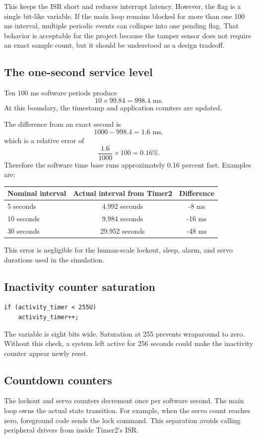\documentclass[11pt,a4paper]{article}
\begin{document}
This keeps the ISR short and reduces interrupt latency. However, the flag is a single bit-like variable. If the main loop remains blocked for more than one 100 ms interval, multiple periodic events can collapse into one pending flag. That behavior is acceptable for the project because the tamper sensor does not require an exact sample count, but it should be understood as a design tradeoff.

\subsection{The one-second service level}
Ten 100 ms software periods produce
\[
10\times99.84=998.4\text{ ms}.
\]
At this boundary, the timestamp and application counters are updated.

The difference from an exact second is
\[
1000-998.4=1.6\text{ ms},
\]
which is a relative error of
\[
\frac{1.6}{1000}\times100=0.16\%.
\]
Therefore the software time base runs approximately 0.16 percent fast. Examples are:
\begin{center}
\begin{tabular}{lcc}
\toprule
Nominal interval & Actual interval from Timer2 & Difference \\
\midrule
5 seconds & 4.992 seconds & -8 ms \\
10 seconds & 9.984 seconds & -16 ms \\
30 seconds & 29.952 seconds & -48 ms \\
\bottomrule
\end{tabular}
\end{center}
This error is negligible for the human-scale lockout, sleep, alarm, and servo durations used in the simulation.

\subsection{Inactivity counter saturation}
\begin{lstlisting}[style=cstyle]
if (activity_timer < 255U)
    activity_timer++;
\end{lstlisting}
The variable is eight bits wide. Saturation at 255 prevents wraparound to zero. Without this check, a system left active for 256 seconds could make the inactivity counter appear newly reset.

\subsection{Countdown counters}
The lockout and servo counters decrement once per software second. The main loop owns the actual state transition. For example, when the servo count reaches zero, foreground code sends the lock command. This separation avoids calling peripheral drivers from inside Timer2's ISR.
\end{document}
